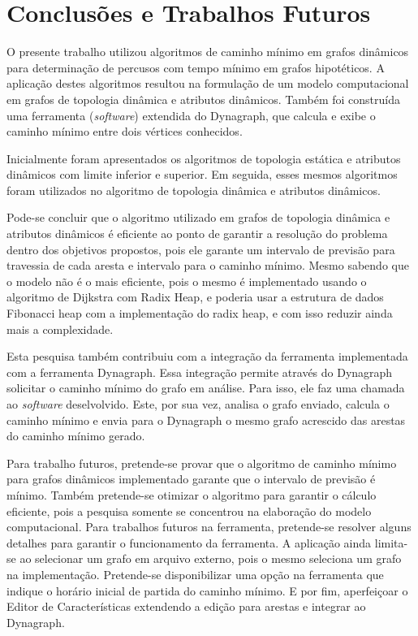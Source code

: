 \chapter{Conclusões e Trabalhos Futuros}

O presente trabalho utilizou algoritmos de caminho mínimo em grafos dinâmicos
para determinação de percusos com tempo mínimo em grafos hipotéticos.
A aplicação destes algoritmos resultou na formulação de um modelo computacional em grafos
de topologia dinâmica e atributos dinâmicos. Também foi construída uma ferramenta (\textit{software})
extendida do Dynagraph, que calcula e exibe o caminho mínimo entre dois vértices conhecidos.

Inicialmente foram apresentados os algoritmos de topologia estática e atributos dinâmicos com
limite inferior e superior. Em seguida, esses mesmos algoritmos foram utilizados no algoritmo
de topologia dinâmica e atributos dinâmicos.

Pode-se concluir que o algoritmo utilizado em grafos de topologia dinâmica e atributos dinâmicos
é eficiente ao ponto de garantir a resolução do problema dentro dos objetivos propostos, pois ele
garante um intervalo de previsão para travessia de cada aresta e intervalo para o caminho mínimo.
Mesmo sabendo que o modelo não é o mais eficiente, pois o mesmo é implementado usando o
algoritmo de Dijkstra com Radix Heap, e poderia usar a estrutura de dados Fibonacci heap com a
implementação do radix heap, e com isso reduzir ainda mais a complexidade.

Esta pesquisa também contribuiu com a integração da ferramenta implementada com a ferramenta Dynagraph.
Essa integração permite através do Dynagraph solicitar o caminho mínimo do grafo em análise. Para isso, ele faz 
uma chamada ao \textit{software} deselvolvido. Este, por sua vez, analisa o grafo enviado, calcula o caminho mínimo
e envia para o Dynagraph o mesmo grafo acrescido das arestas do caminho mínimo gerado.

Para trabalho futuros, pretende-se provar que o algoritmo de caminho mínimo para grafos dinâmicos implementado garante que o
intervalo de previsão é mínimo. Também pretende-se otimizar o algoritmo para garantir o cálculo eficiente, pois a pesquisa
somente se concentrou na elaboração do modelo computacional.
Para trabalhos futuros na ferramenta, pretende-se resolver alguns detalhes para garantir o funcionamento da ferramenta.
A aplicação ainda limita-se ao selecionar um grafo em arquivo externo, pois o mesmo seleciona um grafo na implementação.
Pretende-se disponibilizar uma opção na ferramenta que indique o horário inicial de partida
do caminho mínimo. E por fim, aperfeiçoar o Editor de Características extendendo a edição para arestas e integrar ao Dynagraph.
